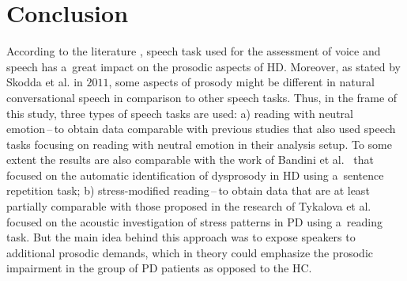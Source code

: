 \section{Conclusion}
\label{ch4_5}

According to the literature \cite{Ho1998, Goberman2005d}, speech task used for the assessment of voice and speech has a~great impact on the prosodic aspects of HD. Moreover, as stated by Skodda et al. in $2011$, some aspects of prosody might be different in natural conversational speech in comparison to other speech tasks. Thus, in the frame of this study, three types of speech tasks are used: a) reading with neutral emotion\,--\,to obtain data comparable with previous studies \cite{Skodda2008, Skodda2010, Skodda2011c, Rusz2011} that also used speech tasks focusing on reading with neutral emotion in their analysis setup. To some extent the results are also comparable with the work of Bandini et al.~\cite{Bandini2015} that focused on the automatic identification of dysprosody in HD using a~sentence repetition task; b) stress-modified reading\,--\,to obtain data that are at least partially comparable with those proposed in the research of Tykalova et al.~\cite{Tykalova2014} focused on the acoustic investigation of stress patterns in PD using a~reading task. But the main idea behind this approach was to expose speakers to additional prosodic demands, which in theory could emphasize the prosodic impairment in the group of PD patients as opposed to the HC.

